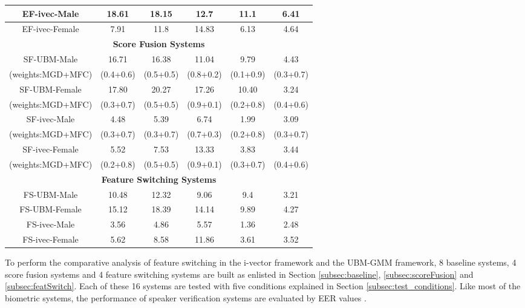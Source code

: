 \documentclass{article}
\begin{document}
\begin{table}[h]
\begin{tabular}{|c|c|c|c|c|c|}
{EF-ivec-Male} & 18.61 & 18.15 & 12.7 & 11.1 & 6.41 \\ \hline

{EF-ivec-Female} & 7.91 & 11.8 & 14.83 & 6.13 & 4.64 \\ \hline 

\multicolumn{6}{|c|}{\bf Score Fusion Systems} \\ \hline

SF-UBM-Male & 16.71 & 16.38 & 11.04 & 9.79 & 4.43 \\ 
(weights:MGD+MFC) & (0.4+0.6) & (0.5+0.5) & (0.8+0.2) & (0.1+0.9) & (0.3+0.7) \\ \hline

SF-UBM-Female & 17.80 & 20.27 & 17.26 & 10.40 & 3.24 \\ 
(weights:MGD+MFC) & (0.3+0.7) & (0.5+0.5) & (0.9+0.1) & (0.2+0.8) & (0.4+0.6) \\ \hline

SF-ivec-Male & 4.48 & 5.39 & 6.74 & 1.99 & 3.09 \\ 
(weights:MGD+MFC) & (0.3+0.7) & (0.3+0.7) & (0.7+0.3) & (0.2+0.8) & (0.3+0.7) \\ \hline

SF-ivec-Female & 5.52 & 7.53 & 13.33 & 3.83 & 3.44 \\ 
(weights:MGD+MFC) & (0.2+0.8) & (0.5+0.5) & (0.9+0.1) & (0.3+0.7) & (0.4+0.6) \\ \hline

\multicolumn{6}{|c|}{\bf Feature Switching Systems} \\ \hline

{FS-UBM-Male} & {10.48} & {12.32} & {9.06} & {9.4} & {3.21} \\  \hline

{FS-UBM-Female} & {15.12 } & {18.39} & {14.14} & {9.89} & {4.27} \\ \hline

{FS-ivec-Male} & {3.56} & {4.86} & {5.57} & {1.36} & {2.48} \\ \hline

{FS-ivec-Female} & {5.62} & {8.58} & 11.86 & {3.61} & {3.52} \\ \hline

	\end{tabular}
	\label{tab:eer}
	\end{table}


To perform the comparative analysis of feature switching in the i-vector framework and the UBM-GMM framework, 8 baseline systems, 4 score fusion systems and 4 feature switching systems are built as enlisted in Section \ref{subsec:baseline}, \ref{subsec:scoreFusion} and \ref{subsec:featSwitch}. Each of these 16 systems are tested with five conditions explained in Section \ref{subsec:test_conditions}. Like most of the biometric systems, the performance of  speaker verification systems are evaluated by EER values \cite{eer1}. 
\end{document}
